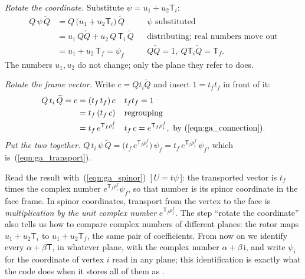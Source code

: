 \emph{Rotate the coordinate.} Substitute $\psi = u_1 + u_2\mathsf T_i$:
\begin{align*}
Q\,\psi\,\widetilde Q &= Q\,\big(u_1 + u_2\mathsf T_i\big)\,\widetilde Q && \psi \text{ substituted} \\
&= u_1\, Q\widetilde Q + u_2\, Q\,\mathsf T_i\,\widetilde Q && \text{distributing; real numbers move out} \\
&= u_1 + u_2\,\mathsf T_f = \psi_f && Q\widetilde Q = 1,\ Q\mathsf T_i\widetilde Q = \mathsf T_f .
\end{align*}
The numbers $u_1, u_2$ do not change; only the plane they refer to does.

\emph{Rotate the frame vector.} Write $c = Q t_i\widetilde Q$ and insert $1 = t_f t_f$ in front of it:
\begin{align*}
Q\, t_i\, \widetilde Q = c &= (t_f\, t_f)\, c && t_f t_f = 1 \\
&= t_f\, (t_f\, c) && \text{regrouping} \\
&= t_f\, e^{\mathsf T_f\rho_i^f} && t_f\,c = e^{\mathsf T_f\rho_i^f},\ \text{by (\ref{eqn:ga_connection})} .
\end{align*}
\emph{Put the two together.} $Q\, t_i\,\psi\,\widetilde Q = \big(t_f\, e^{\mathsf T_f\rho_i^f}\big)\,\psi_f = t_f\, e^{\mathsf T_f\rho_i^f}\,\psi_f$, which is~(\ref{eqn:ga_transport}).

Read the result with~(\ref{eqn:ga_spinor})~[\,$U = t\psi$\,]: the transported vector is $t_f$ times the complex number $e^{\mathsf T_f\rho_i^f}\psi_f$, so that number is its spinor coordinate in the face frame. In spinor coordinates, transport from the vertex to the face is \emph{multiplication by the unit complex number} $e^{\mathsf T_f \rho_i^f}$. The step ``rotate the coordinate'' also tells us how to compare complex numbers of different planes: the rotor maps $u_1 + u_2\mathsf T_i$ to $u_1 + u_2\mathsf T_f$, the same pair of coefficients. From now on we identify every $\alpha + \beta\mathsf T$, in whatever plane, with the complex number $\alpha + \beta\,\mathrm i$, and write $\psi_i$ for the coordinate of vertex $i$ read in any plane; this identification is exactly what the code does when it stores all of them as .

